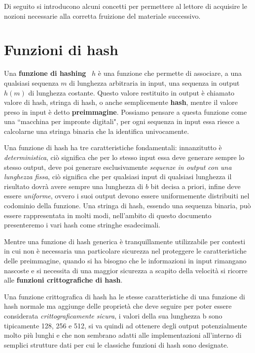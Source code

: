 Di seguito si introducono alcuni concetti 
per permettere al lettore di acquisire le nozioni necessarie alla
corretta fruizione del materiale successivo.

\section{Funzioni di hash}
\label{sub:hash}
Una \textbf{funzione di hashing}~\cite{hash} \(h\) è una funzione che permette di associare,
a una qualsiasi sequenza \(m\) di lunghezza arbitraria in input, una sequenza
in output \(h(m)\) di lunghezza costante. 
Questo valore restituito in output è chiamato valore di hash, stringa di hash,
o anche semplicemente \textbf{hash}, mentre il valore preso in input è detto
\textbf{preimmagine}. Possiamo pensare a questa funzione come una ``macchina per
impronte digitali", per ogni sequenza in input essa riesce a calcolarne una stringa binaria
che la identifica univocamente.

Una funzione di hash ha tre caratteristiche fondamentali:
innanzitutto è \emph{deterministica}, ciò significa che per lo stesso input essa deve
generare sempre lo stesso output, deve poi generare esclusivamente
\emph{sequenze in output con una lunghezza fissa}, ciò significa che per qualsiasi input
di qualsiasi lunghezza il risultato dovrà avere sempre una lunghezza di \(b\) bit decisa
a priori, infine deve essere \emph{uniforme}, ovvero i suoi output devono essere
uniformemente distribuiti nel codominio della funzione.
Una stringa di hash, essendo una sequenza binaria, può essere rappresentata in molti modi,
nell'ambito di questo documento presenteremo i vari hash come stringhe esadecimali.

Mentre una funzione di hash generica è tranquillamente utilizzabile per contesti
in cui non è necessaria una particolare sicurezza nel proteggere le caratteristiche
delle preimmagine, quando si ha bisogno che le
informazioni in input rimangano nascoste e si necessita di una maggior sicurezza a scapito
della velocità si ricorre alle \textbf{funzioni crittografiche di hash}.

Una funzione crittografica di hash ha le stesse caratteristiche di una funzione di
hash normale ma aggiunge delle proprietà che deve seguire per poter essere considerata
\emph{crittograficamente sicura}, i valori della sua lunghezza b sono tipicamente
128, 256 e 512, si va quindi ad ottenere degli output potenzialmente molto più lunghi
e che non sembrano adatti alle implementazioni all'interno di semplici strutture dati
per cui le classiche funzioni di hash sono designate.

